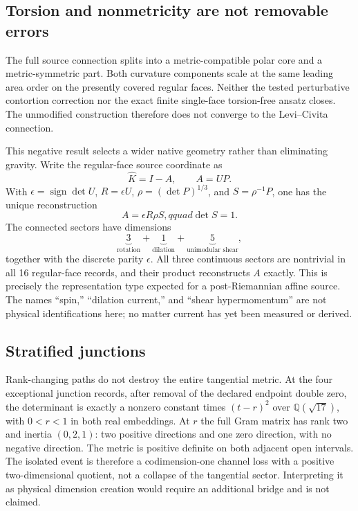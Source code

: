 \documentclass[11pt]{article}
\theoremstyle{definition}
\theoremstyle{remark}
\begin{document}
\subsection{Torsion and nonmetricity are not removable errors}

The full source connection splits into a metric-compatible polar core and a metric-symmetric part. Both curvature components scale at the same leading area order on the presently covered regular faces. Neither the tested perturbative contortion correction nor the exact finite single-face torsion-free ansatz closes. The unmodified construction therefore does not converge to the Levi--Civita connection.

This negative result selects a wider native geometry rather than eliminating gravity. Write the regular-face source coordinate as
\begin{equation}\label{eq:polar}
 \widehat K=I-A,\qquad A=UP.
\end{equation}
With $\epsilon=\operatorname{sign}\det U$, $R=\epsilon U$, $\rho=(\det P)^{1/3}$, and $S=\rho^{-1}P$, one has the unique reconstruction
\begin{equation}\label{eq:hypermomentum}
 A=\epsilon R\rho S,qquad \det S=1.
\end{equation}
The connected sectors have dimensions
\begin{equation}\label{eq:315}
 \underbrace{3}_{\text{rotation}}
 +\underbrace{1}_{\text{dilation}}
 +\underbrace{5}_{\text{unimodular shear}},
\end{equation}
together with the discrete parity $\epsilon$. All three continuous sectors are nontrivial in all 16 regular-face records, and their product reconstructs $A$ exactly. This is precisely the representation type expected for a post-Riemannian affine source. The names ``spin,'' ``dilation current,'' and ``shear hypermomentum'' are not physical identifications here; no matter current has yet been measured or derived.

\subsection{Stratified junctions}

Rank-changing paths do not destroy the entire tangential metric. At the four exceptional junction records, after removal of the declared endpoint double zero, the determinant is exactly a nonzero constant times $(t-r)^2$ over $\mathbb Q(\sqrt{17})$, with $0<r<1$ in both real embeddings. At $r$ the full Gram matrix has rank two and inertia $(0,2,1)$: two positive directions and one zero direction, with no negative direction. The metric is positive definite on both adjacent open intervals. The isolated event is therefore a codimension-one channel loss with a positive two-dimensional quotient, not a collapse of the tangential sector. Interpreting it as physical dimension creation would require an additional bridge and is not claimed.
\end{document}
